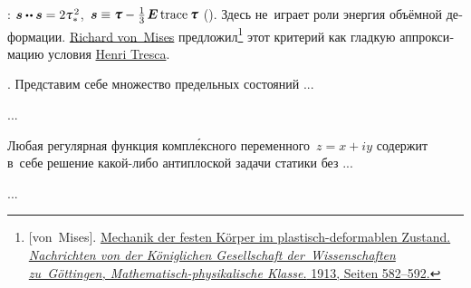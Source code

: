 \begin{otherlanguage}{russian}
:
${\stressdeviator \dotdotp \stressdeviator = 2 \mathtau_{*}^{\hspace{.25ex}2}}$, ${\, \stressdeviator \equiv \cauchystress - \frac{1}{3} \hspace{.25ex} \UnitDyad \trace{\hspace{-0.1ex}\cauchystress}}$ ().
Здесь не~играет роли энергия объёмной деформации.
\href{https://en.wikipedia.org/wiki/Richard_von_Mises}{Richard von~Mises} предложил\footnote{[von~Mises]. \href{https://gdz.sub.uni-goettingen.de/id/PPN252457811_1913?tify=\%7B"pages":\%5B602\%5D,"view":"info"\%7D}{Mechanik der festen K\"{o}rper im plastisch-deformablen Zustand. \emph{Nachrichten von der K\"{o}niglichen Gesellschaft der~Wis\-sen\-schaf\-ten zu~Göttingen, Mathematisch-physikalische Klasse.} 1913, Seiten 582\hbox{--}592.}}\hspace{-0.25ex}
этот критерий как гладкую аппроксимацию условия \href{https://en.wikipedia.org/wiki/Henri_Tresca}{Henri Tresca}.

.
Представим себе множество предельных состояний ...

...



\end{otherlanguage}



\label{para:cracks.antiplanedeformation}

\begin{otherlanguage}{russian}

Любая регулярная функция компл\'{е}ксного переменного~${z = x + iy}$ содержит в~себе решение какой\hbox{-}либо антиплоской задачи статики без ...

...



\end{otherlanguage}


